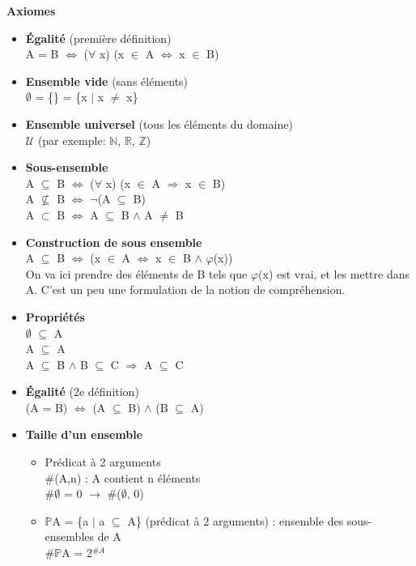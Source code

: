 {\textbf{Axiomes}

\begin{itemize}
\item \textbf{Égalité} (première définition) \\
A = B $\Leftrightarrow$ ($\forall$ x) (x $\in$ A $\Leftrightarrow$ x $\in$ B)\\
\item \textbf{Ensemble vide} (sans éléments)\\
$\emptyset$ = \{\} = \{x $\vert$ x $\neq$ x\}\\
\item \textbf{Ensemble universel} (tous les éléments du domaine)\\
$\mathcal{U}$ (par exemple: $\mathbb{N}$, $\mathbb{R}$, $\mathbb{Z}$)\\
\item \textbf{Sous-ensemble}\\
A $\subseteq$ B $\Leftrightarrow$ ($\forall$ x) (x $\in$ A $\Rightarrow$ x $\in$ B)\\
A $\nsubseteq$ B $\Leftrightarrow$ $\neg$(A $\subseteq$ B)\\
A $\subset$ B $\Leftrightarrow$ A $\subseteq$ B $\wedge$ A $\neq$ B\\
\item \textbf{Construction de sous ensemble} \\
A $\subseteq$ B $\Leftrightarrow$ (x $\in$ A $\Leftrightarrow$ x $\in$ B $\wedge$ $\varphi$(x))\\
On va ici prendre des éléments de B tels que $\varphi$(x) est vrai, et les mettre dans A. C'est un peu une formulation de la notion de compréhension.\\ 
\item \textbf{Propriétés}\\
$\emptyset$ $\subseteq$ A\\
A $\subseteq$ A\\
A $\subseteq$ B $\wedge$ B $\subseteq$ C $\Rightarrow$ A $\subseteq$ C \\
\item \textbf{Égalité} (2e définition)\\
(A = B) $\Leftrightarrow$ (A $\subseteq$ B) $\wedge$ (B $\subseteq$ A)\\
\item \textbf{Taille d'un ensemble} 
    \begin{itemize}
    \item Prédicat à 2 arguments\\
    \#(A,n) : A contient n éléments\\
    \#$\emptyset$ = 0  $\rightarrow$ \#($\emptyset$, 0) 
    \item $\mathbb{P}$A = \{a $\vert$ a $\subseteq$ A\} (prédicat à 2 arguments) : ensemble des sous-ensembles de A\\
    \#$\mathbb{P}$A = 2$^{\#A}$ \\
    \end{itemize}
\end{itemize}

}
